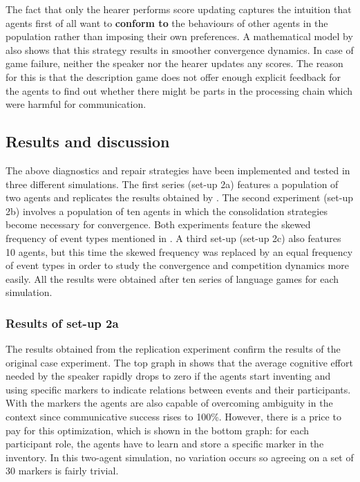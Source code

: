 The fact that only the hearer performs score updating captures the intuition that agents first of all want to {\bfseries conform to} the behaviours of other agents in the population rather than imposing their own preferences. A mathematical model by \citet{devylder07evolution} also shows that this strategy results in smoother convergence dynamics. In case of game failure, neither the speaker nor the hearer updates any scores. The reason for this is that the description game does not offer enough explicit feedback for the agents to find out whether there might be parts in the processing chain which were harmful for communication.

\subsection{Results and discussion}

The above diagnostics and repair strategies have been implemented and tested in three different simulations. The first series (set-up 2a) features a population of two agents and replicates the results obtained by \citet{steels02simulating, steels04constructivist}. The second experiment (set-up 2b) involves a population of ten agents in which the consolidation strategies become necessary for convergence. Both experiments feature the skewed frequency of event types mentioned in . A third set-up (set-up 2c) also features 10 agents, but this time the skewed frequency was replaced by an equal frequency of event types in order to study the convergence and competition dynamics more easily. All the results were obtained after ten series of language games for each simulation.



\subsubsection{Results of set-up 2a}
 The results obtained from the replication experiment confirm the results of the original case experiment. The top graph in  shows that the average cognitive effort needed by the speaker rapidly drops to zero if the agents start inventing and using specific markers to indicate relations between events and their participants. With the markers the agents are also capable of overcoming ambiguity in the context since communicative success rises to 100\%. However, there is a price to pay for this optimization, which is shown in the bottom graph: for each participant role, the agents have to learn and store a specific marker in the inventory. In this two-agent simulation, no variation occurs so agreeing on a set of 30 markers is fairly trivial.

